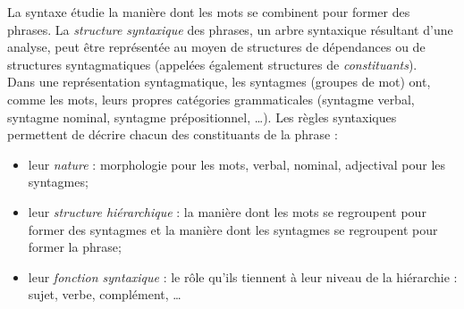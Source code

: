 La syntaxe étudie la manière dont les mots se combinent pour former
des phrases. %
La \emph{structure syntaxique} des phrases, un arbre syntaxique résultant d'une analyse, peut être représentée au moyen de structures de {dépendances} ou de structures {syntagmatiques} (appelées également structures de \emph{constituants}). \\

Dans une représentation syntagmatique, les syntagmes (groupes de mot) ont, comme les mots, leurs propres catégories grammaticales (syntagme verbal, syntagme nominal, syntagme
prépositionnel, \ldots). Les règles syntaxiques permettent de décrire
chacun des constituants de la phrase :

\begin{itemize}
  
\item leur \emph{nature} : morphologie pour les mots, verbal, nominal,
  adjectival pour les syntagmes;
\item leur \emph{structure hiérarchique} : la manière dont les mots se
  regroupent pour former des syntagmes et la manière dont les
  syntagmes se regroupent pour former la phrase;
\item leur \emph{fonction syntaxique} : le rôle qu'ils tiennent à leur
  niveau de la hiérarchie : sujet, verbe, complément, \ldots
\end{itemize}


